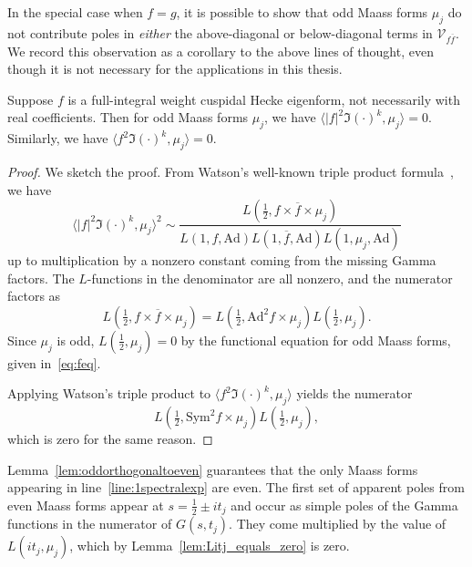In the special case when $f = g$, it is possible to show that odd Maass forms $\mu_j$ do
not contribute poles in \emph{either} the above-diagonal or below-diagonal terms in
$\mathcal{V}_{f \overline{f}}$.
We record this observation as a corollary to the above lines of thought, even though it is
not necessary for the applications in this thesis.


\begin{corollary*}
  Suppose $f$ is a full-integral weight cuspidal Hecke eigenform, not necessarily with
  real coefficients.
  Then for odd Maass forms $\mu_j$, we have $\langle \lvert f \rvert^2 \Im(\cdot)^k, \mu_j
  \rangle = 0$.
  Similarly, we have $\langle f^2 \Im(\cdot)^k, \mu_j \rangle = 0$.
\end{corollary*}


\begin{proof}
  We sketch the proof. From Watson's well-known triple product
  formula~\cite{watson2008rankin}, we have
  \begin{equation}
    \langle \lvert f \rvert^2 \Im(\cdot)^k, \mu_j \rangle^2 \sim \frac{L(\frac{1}{2},
    f\times \overline{f} \times \mu_j)}{L(1, f, \text{Ad}) L(1, \overline{f}, \text{Ad})
    L(1, \mu_j, \text{Ad})}
  \end{equation}
  up to multiplication by a nonzero constant coming from the missing Gamma factors.
  The $L$-functions in the denominator are all nonzero, and the numerator factors as
  \begin{equation}
    L(\tfrac{1}{2}, f \times \overline{f} \times \mu_j) = L(\tfrac{1}{2}, \text{Ad}^2 f
    \times \mu_j) L(\tfrac{1}{2}, \mu_j).
  \end{equation}
  Since $\mu_j$ is odd, $L(\tfrac{1}{2}, \mu_j) = 0$ by the functional equation for odd
  Maass forms, given in~\eqref{eq:feq}.


  Applying Watson's triple product to $\langle f^2 \Im(\cdot)^k, \mu_j \rangle$ yields the
  numerator
  \begin{equation}
    L(\tfrac{1}{2}, \text{Sym}^2 f \times \mu_j) L(\tfrac{1}{2}, \mu_j),
  \end{equation}
  which is zero for the same reason.
\end{proof}



Lemma~\ref{lem:oddorthogonaltoeven} guarantees that the only Maass forms appearing in
line~\eqref{line:1spectralexp} are even. The first set of apparent poles from even Maass
forms appear at $s = \frac{1}{2} \pm it_j$ and occur as simple poles of the Gamma
functions in the numerator of $G(s, t_j)$. They come multiplied by the value of $L(it_j,
\mu_j)$, which by Lemma~\ref{lem:Litj_equals_zero} is zero.



